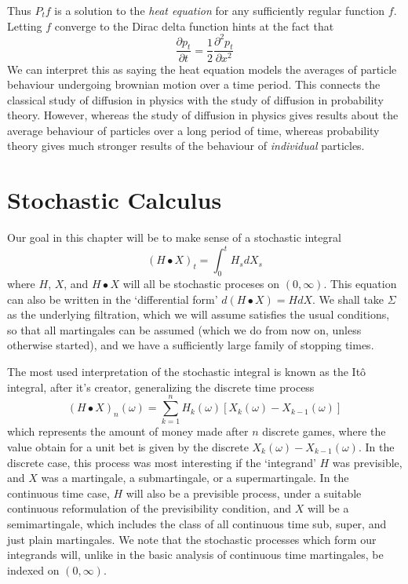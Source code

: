 %
Thus $P_tf$ is a solution to the {\it heat equation} for any sufficiently regular function $f$. Letting $f$ converge to the Dirac delta function hints at the fact that
%
\[ \frac{\partial p_t}{\partial t} = \frac{1}{2} \frac{\partial^2 p_t}{\partial x^2} \]
%
We can interpret this as saying the heat equation models the averages of particle behaviour undergoing brownian motion over a time period. This connects the classical study of diffusion in physics with the study of diffusion in probability theory. However, whereas the study of diffusion in physics gives results about the average behaviour of particles over a long period of time, whereas probability theory gives much stronger results of the behaviour of {\it individual} particles.

\chapter{Stochastic Calculus}

Our goal in this chapter will be to make sense of a stochastic integral
%
\[ (H \bullet X)_t = \int_0^t H_s dX_s \]
%
where $H$, $X$, and $H \bullet X$ will all be stochastic proceses on $(0,\infty)$. This equation can also be written in the `differential form' $d(H \bullet X) = H dX$. We shall take $\Sigma$ as the underlying filtration, which we will assume satisfies the usual conditions, so that all martingales can be assumed \cadlag (which we do from now on, unless otherwise started), and we have a sufficiently large family of stopping times.

The most used interpretation of the stochastic integral is known as the It\^{o} integral, after it's creator, generalizing the discrete time process
%
\[ (H \bullet X)_n(\omega) = \sum_{k = 1}^n H_k(\omega) [X_k(\omega) - X_{k-1}(\omega)] \]
%
which represents the amount of money made after $n$ discrete games, where the value obtain for a unit bet is given by the discrete $X_k(\omega) - X_{k-1}(\omega)$. In the discrete case, this process was most interesting if the `integrand' $H$ was previsible, and $X$ was a martingale, a submartingale, or a supermartingale. In the continuous time case, $H$ will also be a previsible process, under a suitable continuous reformulation of the previsibility condition, and $X$ will be a semimartingale, which includes the class of all continuous time sub, super, and just plain martingales. We note that the stochastic processes which form our integrands will, unlike in the basic analysis of continuous time martingales, be indexed on $(0,\infty)$.


